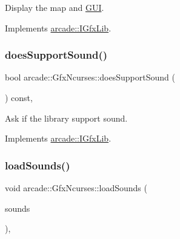 Display the map and \hyperlink{classarcade_1_1_g_u_i}{G\+UI}. 



Implements \hyperlink{classarcade_1_1_i_gfx_lib_a7f280525c718a44c1e05cfe0ba5304c3}{arcade\+::\+I\+Gfx\+Lib}.

\mbox{\label{classarcade_1_1_gfx_ncurses_ab100f60173ccd55f19c30627ace55101}} 
\subsubsection{\texorpdfstring{does\+Support\+Sound()}{doesSupportSound()}}
{\footnotesize\ttfamily bool arcade\+::\+Gfx\+Ncurses\+::does\+Support\+Sound (\begin{DoxyParamCaption}{ }\end{DoxyParamCaption}) const\hspace{0.3cm}{\ttfamily [override]}, {\ttfamily [virtual]}}



Ask if the library support sound. 



Implements \hyperlink{classarcade_1_1_i_gfx_lib_a68cfbc987dfecca5b1405e36e00157b2}{arcade\+::\+I\+Gfx\+Lib}.

\mbox{\label{classarcade_1_1_gfx_ncurses_a450bb0bdb3a31f8733cc71cb39ddfb16}} 
\subsubsection{\texorpdfstring{load\+Sounds()}{loadSounds()}}
{\footnotesize\ttfamily void arcade\+::\+Gfx\+Ncurses\+::load\+Sounds (\begin{DoxyParamCaption}\item[{std\+::vector$<$ std\+::pair$<$ std\+::string, \hyperlink{namespacearcade_a3bb4743a2eea59f3927e404e6549cae5}{Sound\+Type} $>$ $>$ const \&}]{sounds }\end{DoxyParamCaption})\hspace{0.3cm}{\ttfamily [override]}, {\ttfamily [virtual]}}



